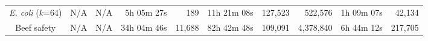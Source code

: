 \begin{table*}
\begin{tabular}{|c|r|r|r|r|r|r|r|r|r|}

    \emph{E. coli} ($k$=64)         & N/A & N/A & 5h 05m 27s & 189 & 11h 21m 08s & 127,523 & 522,576 & 1h 09m 07s & 42,134 \\

    Beef safety & N/A & N/A & 34h 04m 46s & 11,688 & 82h 42m 48s & 109,091 & 4,378,840 & 6h 44m 12s & 217,705 \\


\end{tabular}
\end{table*}
